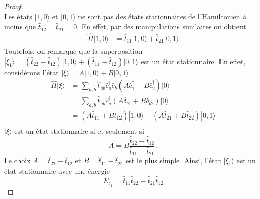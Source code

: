\documentclass{article}
\numberwithin{equation}{section}
\theoremstyle{solution}
\begin{document}
\begin{proof}
\begin{equation}
\end{equation} 
Les états $| 1, 0 \rangle $ et $| 0, 1 \rangle $ ne sont pas des états stationnaires de l'Hamiltonien à moins que $\hat{t}_{12} = \hat{t}_{21}= 0$. En effet, 
par des manipulations similaires on obtient
\begin{align*}
        \hat{H} | 1, 0 \rangle &= \hat{t}_{11} |1, 0  \rangle + \hat{t}_{21}| 0, 1 \rangle 
\end{align*}
Toutefois, on remarque que la superposition $| \xi_1 \rangle  = (\hat{t}_{22} - \hat{t}_{12})| 1, 0 \rangle + (\hat{t}_{11} - \hat{t}_{12})| 0, 1 \rangle$ est un état stationnaire. 
En effet, considérons l'état $| \xi \rangle  = A | 1, 0 \rangle + B | 0, 1 \rangle $
\begin{align*}
        \hat{H}| \xi \rangle &= \sum_{a, b} \hat{t}_{ab}\hat{c}^{\dagger}_a\hat{c}_b (A\hat{c}^{\dagger}_1 + B\hat{c}^{\dagger}_2)| 0 \rangle  \\
        &= \sum_{a, b} \hat{t}_{ab}\hat{c}^{\dagger}_a(A\delta_{b1} + B\delta_{b2})| 0 \rangle  \\
        &= (A\hat{t}_{11} + B\hat{t}_{12})| 1, 0 \rangle + (A\hat{t}_{21} + B\hat{t}_{22})| 0, 1 \rangle \\
\end{align*}
$| \xi \rangle $ est un état stationnaire si et seulement si
\begin{equation}
        A = B \frac{\hat{t}_{22} - \hat{t}_{12}}{\hat{t}_{11} - \hat{t}_{21}}\, .
\end{equation} 
Le choix $A = \hat{t}_{22} - \hat{t}_{12}$ et $B = \hat{t}_{11} - \hat{t}_{21}$ est le plus simple. Ainsi, l'état $| \xi_1 \rangle $ 
est un état stationnaire avec une énergie
\begin{equation}
        E_{\xi_1} = \hat{t}_{11}\hat{t}_{22} - \hat{t}_{21}\hat{t}_{12}
\end{equation} 



\end{proof}
\end{document}
